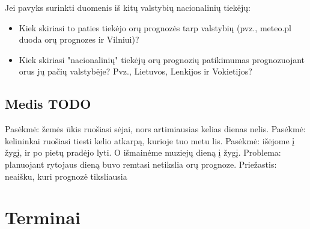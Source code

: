 \documentclass{article}
\begin{document}
Jei pavyks surinkti duomenis iš kitų valstybių nacionalinių tiekėjų:
\begin{itemize}
    \item Kiek skiriasi to paties tiekėjo orų prognozės tarp valstybių (pvz.,
        meteo.pl duoda orų prognozes ir Vilniui)?
    \item Kiek skiriasi "nacionalinių" tiekėjų orų prognozių patikimumas
        prognozuojant orus jų pačių valstybėje? Pvz., Lietuvos, Lenkijos ir
        Vokietijos?
\end{itemize}

\subsection{Medis TODO}

Pasėkmė: žemės ūkis ruošiasi sėjai, nors artimiausias kelias dienas nelis.
Pasėkmė: kelininkai ruošiasi tiesti kelio atkarpą, kurioje tuo metu lis.
Pasėkmė: išėjome į žygį, ir po pietų pradėjo lyti. O išmainėme muziejų dieną į žygį.
Problema: planuojant rytojaus dieną buvo remtasi netikslia orų prognoze.
Priežastis: neaišku, kuri prognozė tiksliausia


\newcommand{\ent}[2]{\begin{varwidth}{5cm} \textbf{#1} #2\end{varwidth}}



\section{Terminai}
\end{document}
